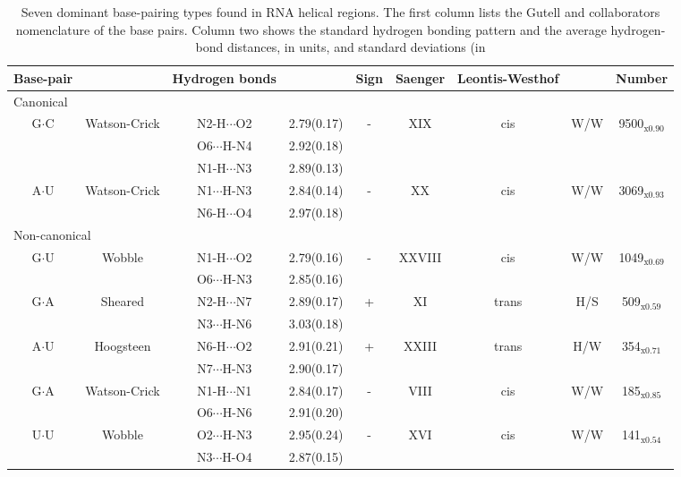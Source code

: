 \begin{table}
\begin{center}
\begin{tabular}{|c c|c c|c|c|c c|c|}
\hline
Base-pair & & Hydrogen bonds &  & Sign & Saenger & Leontis-Westhof & &
Number \\
\hline
\hline
\multicolumn{9}{|l|}{Canonical} \\
\hline
G$\cdot$C & Watson-Crick & N2-H$\cdots$O2 & 2.79(0.17) & - & XIX & cis
 & W/W & 9500$_{\text{x0.90}}$ \\
 & & O6$\cdots$H-N4 & 2.92(0.18) & & & & &  \\
 & & N1-H$\cdots$N3 & 2.89(0.13) & & & & &  \\
\hline
A$\cdot$U & Watson-Crick & N1$\cdots$H-N3 & 2.84(0.14) & - & XX & cis
& W/W & 3069$_{\text{x0.93}}$ \\
 & & N6-H$\cdots$O4 & 2.97(0.18) & & & & &  \\
\hline
\multicolumn{9}{|l|}{Non-canonical} \\
\hline
G$\cdot$U & Wobble & N1-H$\cdots$O2 & 2.79(0.16) & - & XXVIII & cis
 & W/W & 1049$_{\text{x0.69}}$ \\
 & & O6$\cdots$H-N3 & 2.85(0.16) & & & & &  \\
\hline
G$\cdot$A & Sheared & N2-H$\cdots$N7 & 2.89(0.17) & + & XI & trans
 & H/S & 509$_{\text{x0.59}}$ \\
 & & N3$\cdots$H-N6 & 3.03(0.18) & & & & &  \\
\hline
A$\cdot$U & Hoogsteen & N6-H$\cdots$O2 & 2.91(0.21) & + & XXIII & trans
 & H/W & 354$_{\text{x0.71}}$ \\
 & & N7$\cdots$H-N3 & 2.90(0.17) & & & & &  \\
\hline
G$\cdot$A & Watson-Crick & N1-H$\cdots$N1 & 2.84(0.17) & - & VIII & cis
 & W/W & 185$_{\text{x0.85}}$ \\
 & & O6$\cdots$H-N6 & 2.91(0.20) & & & & &  \\
\hline
U$\cdot$U & Wobble & O2$\cdots$H-N3 & 2.95(0.24) & - & XVI & cis
 & W/W & 141$_{\text{x0.54}}$ \\
 & & N3$\cdots$H-O4 & 2.87(0.15) & & & & &  \\
\hline
\end{tabular}
\caption{Seven  dominant  base-pairing  types  found  in  RNA  helical
regions.   The  first  column   lists  the  Gutell  and  collaborators
nomenclature \cite{lee2004}  of the base  pairs. Column two  shows the
standard  hydrogen  bonding  pattern  and  the  average  hydrogen-bond
distances,   in  \AAngstrom   units,  and   standard   deviations  (in
}
\end{center}
\end{table}
